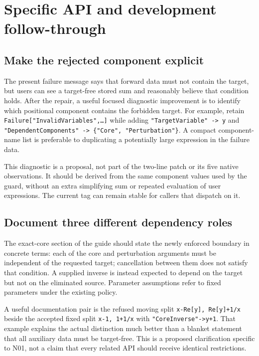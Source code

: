 \documentclass[11pt,letterpaper]{article}
\theoremstyle{remark}\newtheorem{remark}[theorem]{Remark}
\newcommand{\code}[1]{\texttt{#1}}
\begin{document}
\section{Specific API and development follow-through}
\subsection{Make the rejected component explicit}
The present failure message says that forward data must not contain the
target, but users can see a target-free stored sum and reasonably believe that
condition holds. After the repair, a useful focused diagnostic improvement is
to identify which positional component contains the forbidden target.
For example, retain \code{Failure["InvalidVariables",\ldots]} while adding
\code{"TargetVariable" -> y} and
\code{"DependentComponents" -> \{"Core", "Perturbation"\}}.
A compact component-name list is preferable to duplicating a potentially large
expression in the failure data.

This diagnostic is a proposal, not part of the two-line patch or its five
native observations. It should be derived from the same component values used
by the guard, without an extra simplifying sum or repeated evaluation of user
expressions. The current tag can remain stable for callers that dispatch on
it.

\subsection{Document three different dependency roles}
The exact-core section of the guide should state the newly enforced boundary
in concrete terms: each of the core and perturbation arguments must be
independent of the requested target; cancellation between them does not satisfy
that condition. A supplied inverse is instead expected to depend on the target
but not on the eliminated source. Parameter assumptions refer to fixed
parameters under the existing policy.

A useful documentation pair is the refused moving split
\code{x-Re[y], Re[y]+1/x} beside the accepted fixed split
\code{x-1, 1+1/x} with \code{"CoreInverse"->y+1}. That example explains the
actual distinction much better than a blanket statement that all auxiliary data
must be target-free. This is a proposed clarification specific to N01, not a
claim that every related API should receive identical restrictions.
\end{document}
